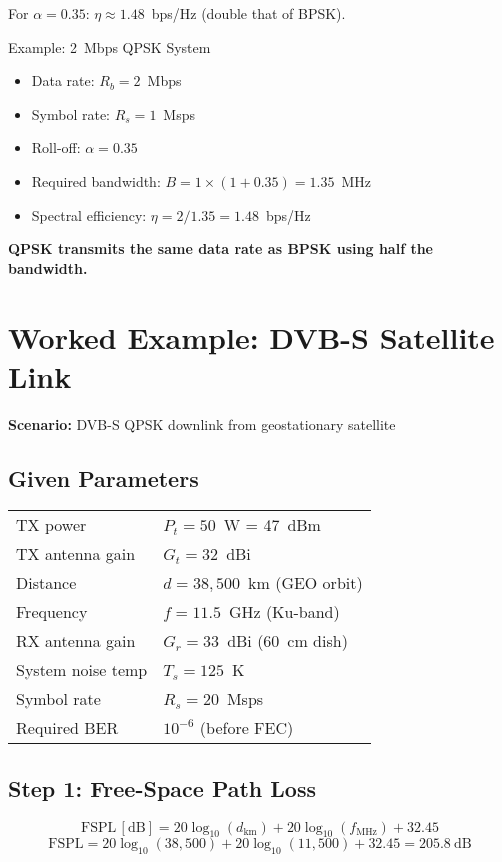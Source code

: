 For $\alpha = 0.35$: $\eta \approx 1.48$~bps/Hz (double that of BPSK).

\begin{calloutbox}{Example: 2~Mbps QPSK System}
\begin{itemize}
\item Data rate: $R_b = 2$~Mbps
\item Symbol rate: $R_s = 1$~Msps
\item Roll-off: $\alpha = 0.35$
\item Required bandwidth: $B = 1 \times (1 + 0.35) = 1.35$~MHz
\item Spectral efficiency: $\eta = 2/1.35 = 1.48$~bps/Hz
\end{itemize}

\textbf{QPSK transmits the same data rate as BPSK using half the bandwidth.}
\end{calloutbox}

\section{Worked Example: DVB-S Satellite Link}

\textbf{Scenario:} DVB-S QPSK downlink from geostationary satellite

\subsection*{Given Parameters}

\begin{tabular}{@{}ll@{}}
TX power & $P_t = 50$~W = 47~dBm \\
TX antenna gain & $G_t = 32$~dBi \\
Distance & $d = 38{,}500$~km (GEO orbit) \\
Frequency & $f = 11.5$~GHz (Ku-band) \\
RX antenna gain & $G_r = 33$~dBi (60~cm dish) \\
System noise temp & $T_s = 125$~K \\
Symbol rate & $R_s = 20$~Msps \\
Required BER & $10^{-6}$ (before FEC) \\
\end{tabular}

\subsection*{Step 1: Free-Space Path Loss}

\begin{equation}
\mathrm{FSPL\,[dB]} = 20\log_{10}(d_{\text{km}}) + 20\log_{10}(f_{\text{MHz}}) + 32.45
\end{equation}
\begin{equation}
\mathrm{FSPL} = 20\log_{10}(38{,}500) + 20\log_{10}(11{,}500) + 32.45 = 205.8~\text{dB}
\end{equation}

